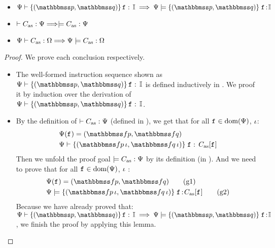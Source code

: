 \begin{lemma}
    \em
    \label{lemma:Logic Ensures Simulation} \mbox{}
    \begin{itemize}
        \item $\wdcblk{\Cspec}{\relastP}{\relastQ}{\lab{}}{\cblk}
            \implies
            \semwfseqrel{\Cspec}{\relastP}{\relastQ}{\cblk}$
        \item $\vdash {C_{\text{as}}} : {\Psi} \Longrightarrow
            \models C_{\text{as}}:\Psi$
        \item ${\Psi} \vdash {C_{\text{as}}} : {\Omega} \Longrightarrow
            {\Psi} \models {C_{\text{as}}} : {\Omega}$
    \end{itemize}
\end{lemma}
\begin{proof}
    We prove each conclusion respectively.
    \begin{itemize}
        \item The well-formed instruction sequence shown as
            $\wdcblk{\Cspec}{\relastP}{\relastQ}{\lab{}}{\cblk}$
            is defined inductively in
            \Fig{\ref{fig:Selected Inference Rules for Refinement Verification}}.
            We proof it by induction over the derivation of
            $\wdcblk{\Cspec}{\relastP}{\relastQ}{\lab{}}{\cblk}$.

        \item By the definition of
            $\vdash {C_{\text{as}}} : {\Psi}$
            (defined in
            \Fig{\ref{fig:Selected Inference Rules for Refinement Verification}}),
            we get that for all $\texttt{f}_{} \in \text{dom}(\Psi{})$, $\iota$:
            \begin{align}
                & \Cspec(\lab{}) = (\relspecpre, \relspecpost)
                    \label{a:wfcdhp-spec} \\
                & \wfcblk{\relspecpre \, \lgvl}
                    {\relspecpost \, \lgvl}{\lab{}}{\asmimp[\lab{}]}
                    \label{a:wfcdblk}
            \end{align}
            Then we unfold the proof goal $\models C_{\text{as}}:\Psi{}$
            by its definition
            (in \Def{\ref{def:soundness of instruction sequence}}).
            And we need to prove that for all
            $\texttt{f}_{} \in \text{dom}(\Psi{})$, $\iota$ :
            \begin{align}
                & \Cspec{}(\lab{}) = (\relspecpre, \relspecpost)
                    \tag{g1} \label{g1} \\
                & \semwfseqrel{\Cspec{}}{\relspecpre \, \lgvl}
                    {\relspecpost \, \lgvl}{\asmimp[\lab{}]}
                    \tag{g2} \label{g2}
            \end{align}
            Because we have already proved that:
            $\wdcblk{\Cspec}{\relastP}{\relastQ}{\lab{}}{\cblk}
            \implies
            \semwfseqrel{\Cspec}{\relastP}{\relastQ}{\cblk}$,
            we finish the proof by applying this lemma.


\end{itemize}
\end{proof}
